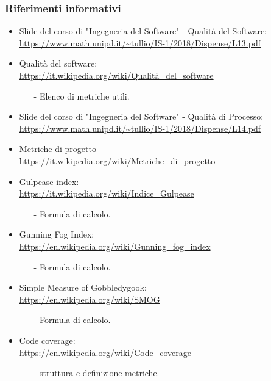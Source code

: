 \subsubsection{Riferimenti informativi}
 \begin{itemize}
 	\item Slide del corso di "Ingegneria del Software" - Qualità del Software: \\
		\url{https://www.math.unipd.it/~tullio/IS-1/2018/Dispense/L13.pdf} 
	\item Qualità del software: \\
		\url{https://it.wikipedia.org/wiki/Qualità_del_software}
		\begin{itemize}
			\item[-] Elenco di metriche utili.
		\end{itemize} 
	\item  Slide del corso di "Ingegneria del Software" - Qualità di Processo: \\
		\url{https://www.math.unipd.it/~tullio/IS-1/2018/Dispense/L14.pdf}
	\item Metriche di progetto \\
 		\url{https://it.wikipedia.org/wiki/Metriche_di_progetto}
 	\item Gulpease index: \\
 		\url{https://it.wikipedia.org/wiki/Indice_Gulpease}
 	\begin{itemize}
 		\item[-] Formula di calcolo.
	\end{itemize}
	\item Gunning Fog Index: \\
		\url{https://en.wikipedia.org/wiki/Gunning_fog_index}
		\begin{itemize}
		\item[-] Formula di calcolo.
		\end{itemize}
	\item Simple Measure of Gobbledygook: \\ 
		 \url{https://en.wikipedia.org/wiki/SMOG}
		 \begin{itemize}
		 	\item[-] Formula di calcolo.
		 \end{itemize} \clearpage
	\item Code coverage: \\ 
		\url{https://en.wikipedia.org/wiki/Code_coverage}
		\begin{itemize}
		\item[-] struttura e definizione metriche.
		\end{itemize}
\end{itemize}